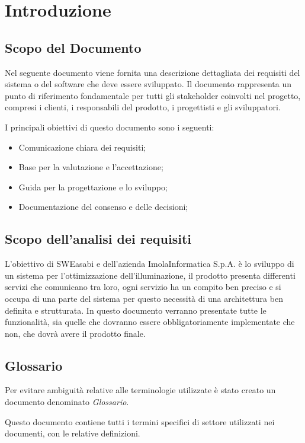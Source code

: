 \chapter{Introduzione}

\section{Scopo del Documento}
Nel seguente documento viene fornita una descrizione dettagliata dei requisiti del sistema o del software che deve essere sviluppato. Il documento rappresenta un punto di riferimento fondamentale per tutti gli stakeholder coinvolti nel progetto, compresi i clienti, i responsabili del prodotto, i progettisti e gli sviluppatori.

I principali obiettivi di questo documento sono i seguenti:
\begin{itemize}
    \item Comunicazione chiara dei requisiti;
    \item Base per la valutazione e l'accettazione;
    \item Guida per la progettazione e lo sviluppo;
    \item Documentazione del consenso e delle decisioni;
\end{itemize}

\section{Scopo dell'analisi dei requisiti}
L'obiettivo di SWEasabi e dell'azienda ImolaInformatica S.p.A. è lo sviluppo di un sistema per l'ottimizzazione dell'illuminazione, il prodotto presenta differenti servizi che comunicano tra loro, ogni servizio ha un compito ben preciso e si occupa di una parte del sistema per questo necessità di una architettura ben definita e strutturata.
In questo documento verranno presentate tutte le funzionalità, sia quelle che dovranno essere obbligatoriamente implementate che non, che dovrà avere il prodotto finale.

\section{Glossario}
Per evitare ambiguità relative alle terminologie utilizzate è stato creato un documento denominato \textit{Glossario}.

Questo documento contiene tutti i termini specifici di settore utilizzati nei documenti, con le relative definizioni.

